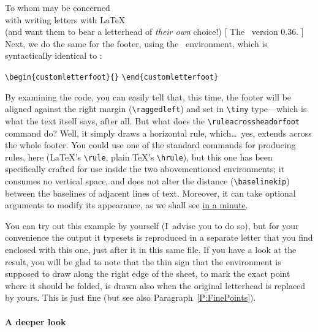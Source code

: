 \begin{letterhead}{
	To whom may be concerned\\
	with writing letters with \LaTeX\\
	(and want them to bear a letterhead
	of \emph{their own} choice!)
}[
	The \Bundle\ version 0.36.
]
Next, we do the same for the footer, using the \eclf\ environment, which is
syntactically identical to \eclh:
%
\begin{flushleft}
	\verb|\begin{customletterfoot}{|\verb|}|\quad
	\quad
	\verb|\end{customletterfoot}|
\end{flushleft}
%
By examining the code, you can easily tell that, this time, the footer will be
aligned against the right margin (\verb|\raggedleft|) and set in \verb|\tiny|
type---which is what the text itself says, after all.  But what does the
\verb|\ruleacrossheadorfoot| command do?  Well, it simply draws a horizontal
rule, which\ldots\ yes, extends across the whole footer.  You could use one of
the standard commands for producing rules, here (\LaTeX's \verb|\rule|, plain
\TeX's \verb|\hrule|), but this one has been specifically crafted for use inside
the two abovementioned environments; it consumes no vertical space, and does not
alter the distance (\verb|\baselinekip|) between the baselines of adjacent lines
of text.  Moreover, it can take optional arguments to modify its appearance, as
we shall see \hyperref[P:FinePoints]{in a minute}.

You can try out this example by yourself (I~advise you to do so), but for your
convenience the output it typesets is reproduced in a separate letter that you
find enclosed with this one, just after it in this same file.  If you have a
look at the result, you will be glad to note that the thin sign that the
 environment is supposed to draw along the right edge of
the sheet, to mark the exact point where it should be folded, is drawn also when
the original letterhead is replaced by yours.  This is just fine (but see also
Paragraph~\ref{P:FinePoints}).



\paragraph{A deeper look}
\label{P:Deeper}


\end{letterhead}
